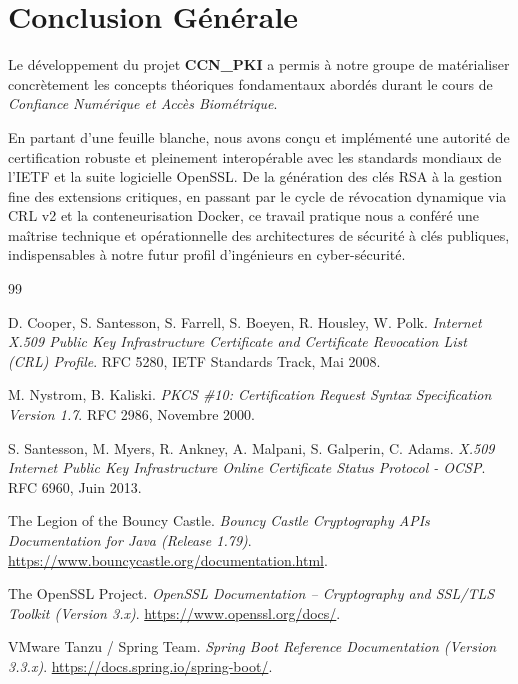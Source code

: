 \documentclass[12pt,a4paper]{report}
\begin{document}
\chapter*{Conclusion Générale}

Le développement du projet \textbf{CCN\_PKI} a permis à notre groupe de matérialiser concrètement les concepts théoriques fondamentaux abordés durant le cours de \textit{Confiance Numérique et Accès Biométrique}. 

En partant d'une feuille blanche, nous avons conçu et implémenté une autorité de certification robuste et pleinement interopérable avec les standards mondiaux de l'IETF et la suite logicielle OpenSSL. De la génération des clés RSA à la gestion fine des extensions critiques, en passant par le cycle de révocation dynamique via CRL v2 et la conteneurisation Docker, ce travail pratique nous a conféré une maîtrise technique et opérationnelle des architectures de sécurité à clés publiques, indispensables à notre futur profil d'ingénieurs en cyber-sécurité.

\begin{thebibliography}{99}

D. Cooper, S. Santesson, S. Farrell, S. Boeyen, R. Housley, W. Polk.
\textit{Internet X.509 Public Key Infrastructure Certificate and Certificate Revocation List (CRL) Profile}.
RFC 5280, IETF Standards Track, Mai 2008.

M. Nystrom, B. Kaliski.
\textit{PKCS \#10: Certification Request Syntax Specification Version 1.7}.
RFC 2986, Novembre 2000.

S. Santesson, M. Myers, R. Ankney, A. Malpani, S. Galperin, C. Adams.
\textit{X.509 Internet Public Key Infrastructure Online Certificate Status Protocol - OCSP}.
RFC 6960, Juin 2013.

The Legion of the Bouncy Castle.
\textit{Bouncy Castle Cryptography APIs Documentation for Java (Release 1.79)}.
\url{https://www.bouncycastle.org/documentation.html}.

The OpenSSL Project.
\textit{OpenSSL Documentation -- Cryptography and SSL/TLS Toolkit (Version 3.x)}.
\url{https://www.openssl.org/docs/}.

VMware Tanzu / Spring Team.
\textit{Spring Boot Reference Documentation (Version 3.3.x)}.
\url{https://docs.spring.io/spring-boot/}.

\end{thebibliography}
\end{document}
